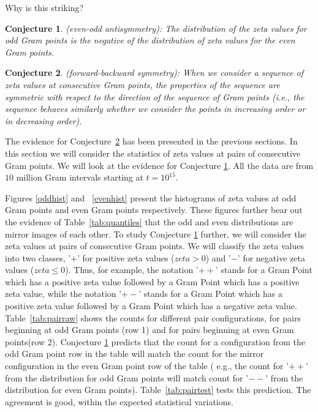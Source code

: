 \documentclass[twoside]{article}
\newtheorem{mydef}{Conjecture}
\begin{document}
Why is this striking?

\begin{mydef}\label{antisymmetry}
(even-odd antisymmetry): The distribution of the zeta values for odd Gram points is the negative of the distribution of zeta values for the even Gram points.
\end{mydef}
\begin{mydef}\label{symmetry}
(forward-backward symmetry): When we consider a sequence of zeta values at consecutive Gram points, the properties of the sequence are symmetric with respect to the direction of the sequence of Gram points (i.e., the sequence behaves similarly whether we consider the points in increasing order or in decreasing order).
\end{mydef}

The evidence for  Conjecture~\ref{symmetry} has been presented in the previous sections. 
In this section we will consider the statistics of zeta values at pairs of consecutive Gram points. We will look at the evidence for Conjecture \ref{antisymmetry}.  All the data  are from $10$ million Gram intervals starting at $t=10^{15}$.

Figures \ref{oddhist} and ~\ref{evenhist}  present the histograms of zeta values at odd Gram points and even Gram points respectively. These figures further bear out the evidence of Table~\ref{tab:quantiles} that the odd and even distributions are mirror images of each other. To study Conjecture \ref{antisymmetry} further, we will consider the zeta values at pairs of consecutive Gram points. We will classify the zeta values into two classes, '$+$' for positive zeta values ($zeta > 0$) and '$-$' for negative zeta values ($zeta \leqslant  0$). Thus, for example, the notation '$++$' stands for a Gram Point which has a positive zeta value followed by a Gram Point which has a positive zeta value, while the notation '$+-$' stands for a Gram Point which has a positive zeta value followed by a Gram Point which has a negative zeta value. Table~\ref{tab:pairraw} shows the counts for different pair configurations, for pairs beginning at odd Gram points (row 1) and for pairs beginning at even Gram points(row 2). Conjecture \ref{antisymmetry} predicts that the count for a configuration from the odd Gram point row in the table  will match the count for the mirror configuration in the even Gram point row of the table ( e.g., the count for '$++$' from the distribution for odd Gram points will match count for '$--$' from the distribution for even Gram points). Table~\ref{tab:pairtest} tests this prediction. The agreement is good, within the expected statistical variations. 
\end{document}
